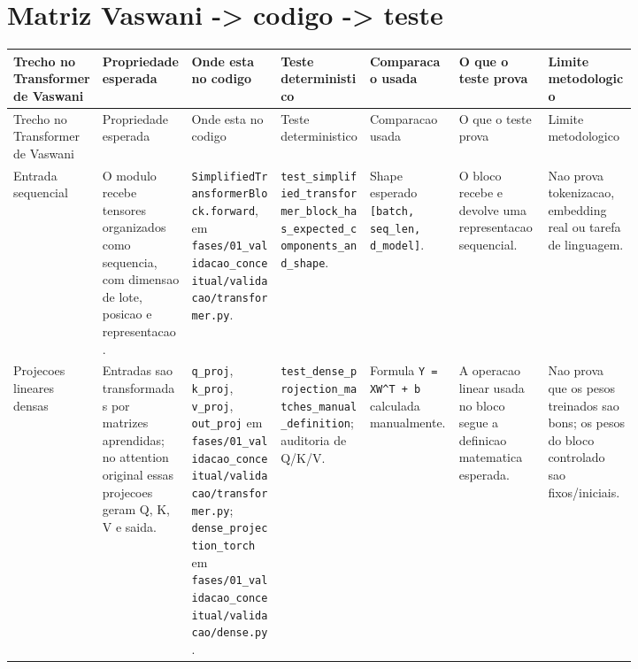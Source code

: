 \section{Matriz Vaswani -> codigo -> teste}



\begin{landscape}
\scriptsize
\begin{longtable}{@{}>{\RaggedRight\arraybackslash}p{0.117\linewidth}>{\RaggedRight\arraybackslash}p{0.117\linewidth}>{\RaggedRight\arraybackslash}p{0.117\linewidth}>{\RaggedRight\arraybackslash}p{0.117\linewidth}>{\RaggedRight\arraybackslash}p{0.117\linewidth}>{\RaggedRight\arraybackslash}p{0.117\linewidth}>{\RaggedRight\arraybackslash}p{0.117\linewidth}@{}}
\toprule
Trecho no Transformer de Vaswani & Propriedade esperada & Onde esta no codigo & Teste deterministico & Comparacao usada & O que o teste prova & Limite metodologico \\
\midrule
\endfirsthead
\toprule
Trecho no Transformer de Vaswani & Propriedade esperada & Onde esta no codigo & Teste deterministico & Comparacao usada & O que o teste prova & Limite metodologico \\
\midrule
\endhead
Entrada sequencial & O modulo recebe tensores organizados como sequencia, com dimensao de lote, posicao e representacao. & \texttt{Simplified\allowbreak{}Transformer\allowbreak{}Block.\allowbreak{}forward}, em \texttt{fases/\allowbreak{}01\_\allowbreak{}validacao\_\allowbreak{}conceitual/\allowbreak{}validacao/\allowbreak{}transformer.\allowbreak{}py}. & \texttt{test\_\allowbreak{}simplified\_\allowbreak{}transformer\_\allowbreak{}block\_\allowbreak{}has\_\allowbreak{}expected\_\allowbreak{}components\_\allowbreak{}and\_\allowbreak{}shape}. & Shape esperado \texttt{[batch, seq\_\allowbreak{}len, d\_\allowbreak{}model]}. & O bloco recebe e devolve uma representacao sequencial. & Nao prova tokenizacao, embedding real ou tarefa de linguagem. \\
Projecoes lineares densas & Entradas sao transformadas por matrizes aprendidas; no attention original essas projecoes geram Q, K, V e saida. & \texttt{q\_\allowbreak{}proj}, \texttt{k\_\allowbreak{}proj}, \texttt{v\_\allowbreak{}proj}, \texttt{out\_\allowbreak{}proj} em \texttt{fases/\allowbreak{}01\_\allowbreak{}validacao\_\allowbreak{}conceitual/\allowbreak{}validacao/\allowbreak{}transformer.\allowbreak{}py}; \texttt{dense\_\allowbreak{}projection\_\allowbreak{}torch} em \texttt{fases/\allowbreak{}01\_\allowbreak{}validacao\_\allowbreak{}conceitual/\allowbreak{}validacao/\allowbreak{}dense.\allowbreak{}py}. & \texttt{test\_\allowbreak{}dense\_\allowbreak{}projection\_\allowbreak{}matches\_\allowbreak{}manual\_\allowbreak{}definition}; auditoria de Q/K/V. & Formula \texttt{Y = XW\textasciicircum{}T + b} calculada manualmente. & A operacao linear usada no bloco segue a definicao matematica esperada. & Nao prova que os pesos treinados sao bons; os pesos do bloco controlado sao fixos/iniciais. \\

\end{longtable}
\end{landscape}
